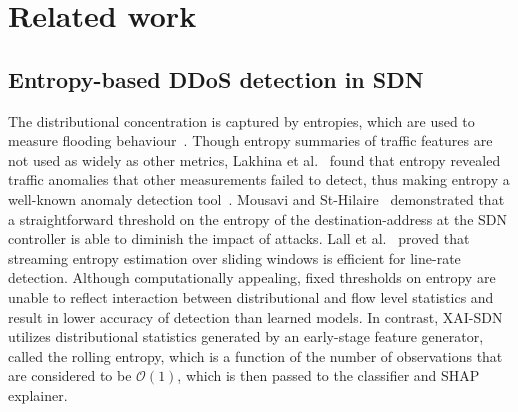 \documentclass{ieeeaccess}
\begin{document}
\section{Related work}
\label{sec:related}

\subsection{Entropy-based DDoS detection in SDN}
The distributional concentration is captured by entropies, which are used to measure flooding behaviour~\cite{nychis2008entropy}. Though entropy summaries of traffic features are not used as widely as other metrics, Lakhina et al.~\cite{lakhina2005mining} found that entropy revealed traffic anomalies that other measurements failed to detect, thus making entropy a well-known anomaly detection tool~\cite{bhuyan2014network}. Mousavi and St-Hilaire~\cite{mousavi2015early} demonstrated that a straightforward threshold on the entropy of the destination-address at the SDN controller is able to diminish the impact of attacks. Lall et al.~\cite{lall2006entropy} proved that streaming entropy estimation over sliding windows is efficient for line-rate detection. Although computationally appealing, fixed thresholds on entropy are unable to reflect interaction between distributional and flow level statistics and result in lower accuracy of detection than learned models. In contrast, XAI-SDN utilizes distributional statistics generated by an early-stage feature generator, called the rolling entropy, which is a function of the number of observations that are considered to be $\mathcal{O}(1)$, which is then passed to the classifier and SHAP explainer.
\end{document}
